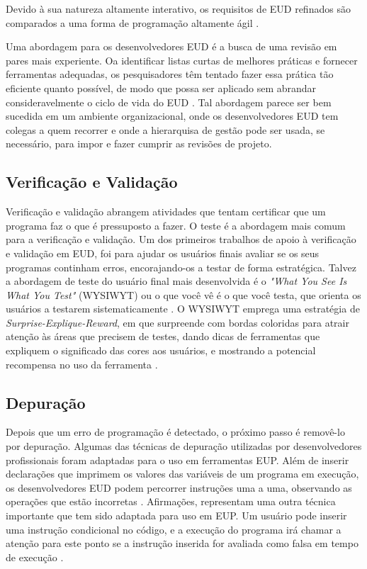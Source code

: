 Devido à sua natureza altamente interativo, os requisitos de EUD refinados são comparados a uma forma de programação altamente ágil \cite{lieberman2006}.

Uma abordagem para os desenvolvedores EUD é a busca de uma revisão em pares mais experiente. Oa identificar listas curtas de melhores práticas e fornecer ferramentas adequadas, os pesquisadores têm tentado fazer essa prática tão eficiente quanto possível, de modo que possa ser aplicado sem abrandar consideravelmente o ciclo de vida do EUD \cite{powell2008management,rosson2013end}. Tal abordagem parece ser bem sucedida em um ambiente organizacional, onde os desenvolvedores EUD tem colegas a quem recorrer e onde a hierarquisa de gestão pode ser usada, se necessário, para impor e fazer cumprir as revisões de projeto.

\subsection{Verificação e Validação}

Verificação e validação abrangem atividades que tentam certificar que um programa faz o que é pressuposto a fazer. O teste é a abordagem mais comum para a verificação e validação. Um dos primeiros trabalhos de apoio à verificação e validação em EUD, foi para ajudar os usuários finais avaliar se os seus programas continham erros, encorajando-os a testar de forma estratégica. Talvez a abordagem de teste do usuário final mais desenvolvida é o \textit{"What You See Is What You Test"} (WYSIWYT) ou o que você vê é o que você testa, que orienta os usuários a testarem sistematicamente \cite{fisher2006integrating}. O WYSIWYT emprega uma estratégia de \textit{Surprise-Explique-Reward}, em que surpreende com bordas coloridas para atrair atenção às áreas que precisem de testes, dando dicas de ferramentas que expliquem o significado das cores aos usuários, e mostrando a potencial recompensa no uso da ferramenta \cite{wilson2003harnessing}.

\subsection{Depuração}

Depois que um erro de programação é detectado, o próximo passo é removê-lo por depuração. Algumas das técnicas de depuração utilizadas por desenvolvedores profissionais foram adaptadas para o uso em ferramentas EUP. Além de inserir declarações que imprimem os valores das variáveis de um programa em execução, os desenvolvedores EUD podem percorrer instruções uma a uma, observando as operações que estão incorretas \cite{leshed2008coscripter}. Afirmações, representam uma outra técnica importante que tem sido adaptada para uso em EUP. Um usuário pode inserir uma instrução condicional no código, e a execução do programa irá chamar a atenção para este ponto se a instrução inserida for avaliada como falsa em tempo de execução \cite{burnett10,koesnandar2008using,scaffidi2008topes}.

